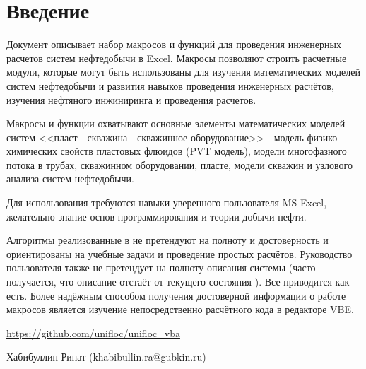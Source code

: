 \chapter*{Введение}                         %

Документ описывает набор макросов и функций \unf{} для проведения инженерных расчетов систем нефтедобычи в Excel. Макросы \unf{} позволяют строить расчетные модули, которые могут быть использованы для изучения математических моделей систем нефтедобычи и развития навыков проведения инженерных расчётов, изучения нефтяного инжиниринга и проведения расчетов.

Макросы и функции \unf{} охватывают основные элементы математических моделей систем <<пласт - скважина - скважинное оборудование>> - модель физико-химических свойств пластовых флюидов (PVT модель), модели многофазного потока в трубах, скважинном оборудовании, пласте, модели скважин и узлового анализа систем нефтедобычи.  

Для использования \unf{} требуются навыки уверенного пользователя MS Excel, желательно знание основ программирования и теории добычи нефти. 

Алгоритмы реализованные в  \unf{} не претендуют на полноту и достоверность и ориентированы на учебные задачи и проведение простых расчётов. Руководство пользователя также не претендует на полноту описания системы (часто получается, что описание отстаёт от текущего состояния \unf{}). Все приводится как есть. Более надёжным способом получения достоверной информации о работе макросов \unf{} является изучение непосредственно расчётного кода в редакторе VBE.


\url{https://github.com/unifloc/unifloc_vba}

Хабибуллин Ринат (khabibullin.ra@gubkin.ru)  